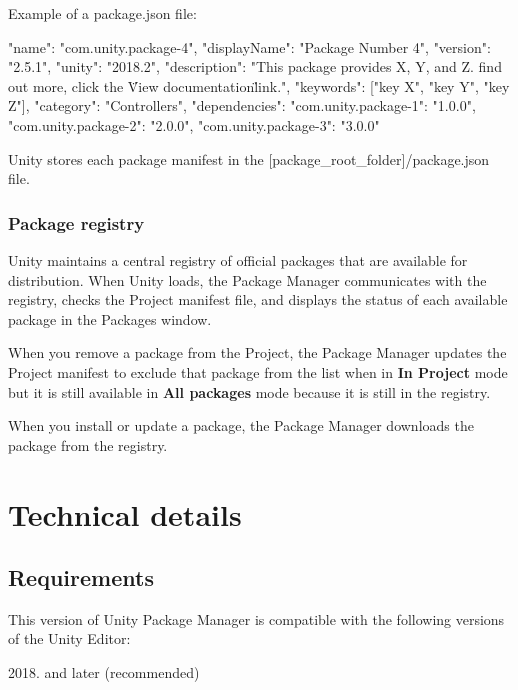 Example of a {\ttfamily package.\+json} file\+: \begin{DoxyVerb}{
    "name": "com.unity.package-4",
    "displayName": "Package Number 4",
    "version": "2.5.1",
    "unity": "2018.2",
    "description": "This package provides X, Y, and Z. \n\nTo find out more, click the \"View documentation\" link.",
    "keywords": ["key X", "key Y", "key Z"],
    "category": "Controllers",
    "dependencies": {
        "com.unity.package-1": "1.0.0",
        "com.unity.package-2": "2.0.0",
        "com.unity.package-3": "3.0.0"
    }
}
\end{DoxyVerb}


Unity stores each package manifest in the {\ttfamily \mbox{[}package\+\_\+root\+\_\+folder\mbox{]}/package.json} file.

\label{_PackManRegistry}%
 \subsubsection*{Package registry}

Unity maintains a central registry of official packages that are available for distribution. When Unity loads, the Package Manager communicates with the registry, checks the Project manifest file, and displays the status of each available package in the Packages window.

When you remove a package from the Project, the Package Manager updates the Project manifest to exclude that package from the list when in {\bfseries{In Project}} mode but it is still available in {\bfseries{All packages}} mode because it is still in the registry.

When you install or update a package, the Package Manager downloads the package from the registry.

\section*{Technical details}

\subsection*{Requirements}

This version of Unity Package Manager is compatible with the following versions of the Unity Editor\+:


\begin{DoxyItemize}
\item 2018. and later (recommended)
\end{DoxyItemize}

